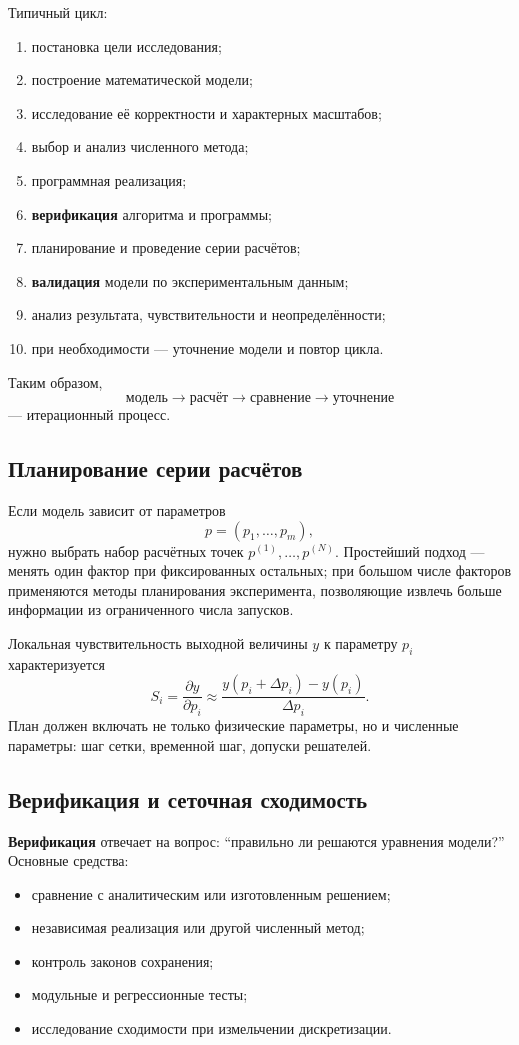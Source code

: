Типичный цикл:
\begin{enumerate}
\item постановка цели исследования;
\item построение математической модели;
\item исследование её корректности и характерных масштабов;
\item выбор и анализ численного метода;
\item программная реализация;
\item \textbf{верификация} алгоритма и программы;
\item планирование и проведение серии расчётов;
\item \textbf{валидация} модели по экспериментальным данным;
\item анализ результата, чувствительности и неопределённости;
\item при необходимости --- уточнение модели и повтор цикла.
\end{enumerate}

Таким образом,
\[
\text{модель}\rightarrow\text{расчёт}\rightarrow\text{сравнение}\rightarrow\text{уточнение}
\]
--- итерационный процесс.

\subsection{Планирование серии расчётов}

Если модель зависит от параметров
\[
p=(p_1,\ldots,p_m),
\]
нужно выбрать набор расчётных точек $p^{(1)},\ldots,p^{(N)}$. Простейший подход --- менять один фактор при фиксированных остальных; при большом числе факторов применяются методы планирования эксперимента, позволяющие извлечь больше информации из ограниченного числа запусков.

Локальная чувствительность выходной величины $y$ к параметру $p_i$ характеризуется
\[
S_i=\frac{\partial y}{\partial p_i}
\approx
\frac{y(p_i+\Delta p_i)-y(p_i)}{\Delta p_i}.
\]
План должен включать не только физические параметры, но и численные параметры: шаг сетки, временной шаг, допуски решателей.

\subsection{Верификация и сеточная сходимость}

\textbf{Верификация} отвечает на вопрос: ``правильно ли решаются уравнения модели?'' Основные средства:
\begin{itemize}
\item сравнение с аналитическим или изготовленным решением;
\item независимая реализация или другой численный метод;
\item контроль законов сохранения;
\item модульные и регрессионные тесты;
\item исследование сходимости при измельчении дискретизации.
\end{itemize}

